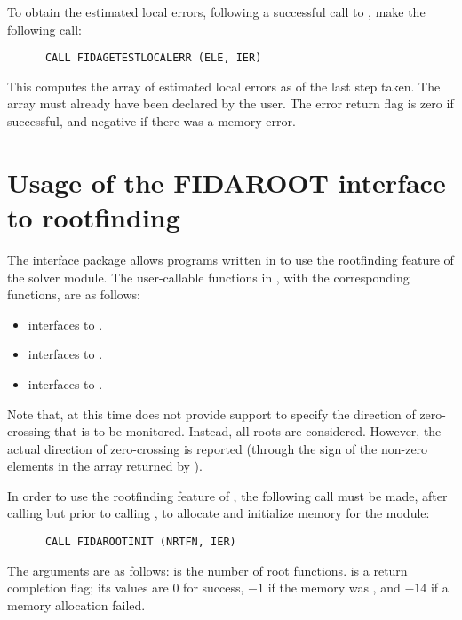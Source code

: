 To obtain the estimated local errors, following a successful call to
, make the following call:
\begin{verbatim}
      CALL FIDAGETESTLOCALERR (ELE, IER)
\end{verbatim}
This computes the  array of estimated local errors as of the last
step taken.  The array  must already have been declared by the user.
The error return flag  is zero if successful, and negative if there
was a memory error.

\section{Usage of the FIDAROOT interface to rootfinding}

The {\fidaroot} interface package allows programs written in {\F} to
use the rootfinding feature of the {\ida} solver module.
The user-callable functions in {\fidaroot}, with the corresponding
{\ida} functions, are as follows:
\begin{itemize}
  \item {} interfaces to .
  \item {} interfaces to .
  \item {} interfaces to .
\end{itemize}
Note that, at this time {\fidaroot} does not provide support to
specify the direction of zero-crossing that is to be monitored.
Instead, all roots are considered. However, the actual direction
of zero-crossing is reported (through the sign of the non-zero
elements in the array  returned by ).

In order to use the rootfinding feature of {\ida}, the following call must
be made, after calling  but prior to calling ,
to allocate and initialize memory for the  module:
\begin{verbatim}
      CALL FIDAROOTINIT (NRTFN, IER)
\end{verbatim}
The arguments are as follows:
 is the number of root functions.
 is a return completion flag; its values are $0$ for success, $-1$
if the  memory was , and $-14$ if a memory allocation failed.

